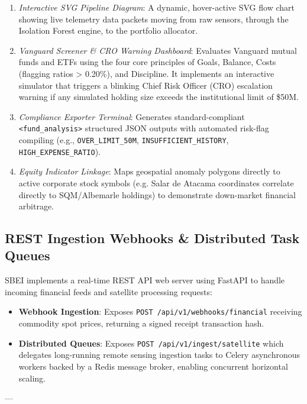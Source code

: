 \begin{enumerate}
  \item \textit{Interactive SVG Pipeline Diagram}: A dynamic, hover-active SVG flow chart showing live telemetry data packets moving from raw sensors, through the Isolation Forest engine, to the portfolio allocator.
  \item \textit{Vanguard Screener \& CRO Warning Dashboard}: Evaluates Vanguard mutual funds and ETFs using the four core principles of Goals, Balance, Costs (flagging ratios > 0.20\%), and Discipline. It implements an interactive simulator that triggers a blinking Chief Risk Officer (CRO) escalation warning if any simulated holding size exceeds the institutional limit of \$50M.
  \item \textit{Compliance Exporter Terminal}: Generates standard-compliant \texttt{<fund\_analysis>} structured JSON outputs with automated risk-flag compiling (e.g., \texttt{OVER\_LIMIT\_50M}, \texttt{INSUFFICIENT\_HISTORY}, \texttt{HIGH\_EXPENSE\_RATIO}).
  \item \textit{Equity Indicator Linkage}: Maps geospatial anomaly polygons directly to active corporate stock symbols (e.g. Salar de Atacama coordinates correlate directly to SQM/Albemarle holdings) to demonstrate down-market financial arbitrage.

\end{enumerate}
\subsection{REST Ingestion Webhooks \& Distributed Task Queues}
SBEI implements a real-time REST API web server using FastAPI to handle incoming financial feeds and satellite processing requests:
\begin{itemize}
  \item \textbf{Webhook Ingestion}: Exposes \texttt{POST /api/v1/webhooks/financial} receiving commodity spot prices, returning a signed receipt transaction hash.
  \item \textbf{Distributed Queues}: Exposes \texttt{POST /api/v1/ingest/satellite} which delegates long-running remote sensing ingestion tasks to Celery asynchronous workers backed by a Redis message broker, enabling concurrent horizontal scaling.

\end{itemize}
---

